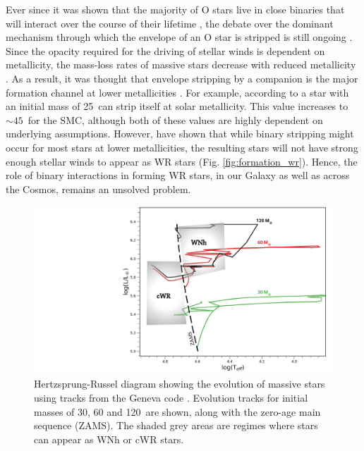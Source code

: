Ever since it was shown that the majority of O stars live in close binaries that will interact over the course of their lifetime \citep{sana_binary_2012}, the debate over the dominant mechanism through which the envelope of an O star is stripped is still ongoing \citep{vanbeveren_wr_1998,foellmi_wolf-rayet_2003,shenar_wolf-rayet_2019,neugent_close_2014,shenar_why_2020}. Since the opacity required for the driving of stellar winds is dependent on metallicity, the mass-loss rates of massive stars decrease with reduced metallicity \citep{vink_mass-loss_2001,vink_metallicity_2005,hainich_wolf-rayet_2015,shenar_wolf-rayet_2019}. As a result, it was thought that envelope stripping by a companion is the major formation channel at lower metallicities \citep{maeder_new_1994,smith_mass_2014,groh_grids_2019}. For example, according to \citet{meynet_stellar_2003,meynet_stellar_2005} a star with an initial mass of 25\,\Msun{} can strip itself at solar metallicity. This value increases to ${\sim}45\,$\Msun{} for the SMC, although both of these values are highly dependent on underlying assumptions. However, \citet{shenar_why_2020} have shown that while binary stripping might occur for most stars at lower metallicities, the resulting stars will not have strong enough stellar winds to appear as WR stars (Fig. \ref{fig:formation_wr}). Hence, the role of binary interactions in forming WR stars, in our Galaxy as well as across the Cosmos, remains an unsolved problem. 

\begin{figure}
    \centering
    \includegraphics[width=\hsize]{chapters/introduction/image/HRD_GENEVA.pdf}
    \caption{Hertzsprung-Russel diagram showing the evolution of massive stars using tracks from the Geneva code \citep{2012Ekstrom}. Evolution tracks for initial masses of 30, 60 and 120\,\Msun{} are shown, along with the zero-age main sequence (ZAMS). The shaded grey areas are regimes where stars can appear as WNh or cWR stars.}
    \label{fig:hrd_geneva}
\end{figure}

